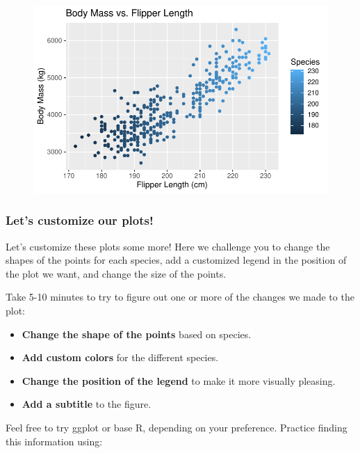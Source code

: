 \documentclass[
  letterpaper,
  DIV=11,
  numbers=noendperiod]{scrreprt}
\providecommand{\tightlist}{%
  \setlength{\itemsep}{0pt}\setlength{\parskip}{0pt}}\usepackage{longtable,booktabs,array}
\begin{document}
\begin{figure}[H]

{\centering \includegraphics{scripts/02_dataViz/class4_files/figure-pdf/local_aesthetics2-1.pdf}

}

\end{figure}

\hypertarget{lets-customize-our-plots}{%
\subsubsection{Let's customize our
plots!}\label{lets-customize-our-plots}}

Let's customize these plots some more! Here we challenge you to change
the shapes of the points for each species, add a customized legend in
the position of the plot we want, and change the size of the points.

Take 5-10 minutes to try to figure out one or more of the changes we
made to the plot:

\begin{itemize}
\tightlist
\item
  \textbf{Change the shape of the points} based on species.
\item
  \textbf{Add custom colors} for the different species.
\item
  \textbf{Change the position of the legend} to make it more visually
  pleasing.
\item
  \textbf{Add a subtitle} to the figure.
\end{itemize}

Feel free to try ggplot or base R, depending on your preference.
Practice finding this information using:
\end{document}
